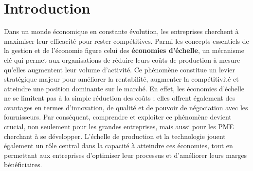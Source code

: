 
\begin{section}


 \chapter*{Introduction}

 \par
 Dans un monde économique en constante évolution, les entreprises cherchent à
 maximiser leur efficacité pour rester compétitives. Parmi les concepts
 essentiels de la gestion et de l’économie figure celui des \textbf{économies
   d’échelle}, un mécanisme clé qui permet aux organisations de réduire leurs
 coûts de production à mesure qu’elles augmentent leur volume d’activité. Ce
 phénomène constitue un levier stratégique majeur pour améliorer la rentabilité,
 augmenter la compétitivité et atteindre une position dominante sur le marché.
 En effet, les économies d’échelle ne se limitent pas à la simple réduction des
 coûts ; elles offrent également des avantages en termes d'innovation, de
 qualité et de pouvoir de négociation avec les fournisseurs. Par conséquent,
 comprendre et exploiter ce phénomène devient crucial, non seulement pour les
 grandes entreprises, mais aussi pour les PME cherchant à se développer.
 L’échelle de production et la technologie jouent également un rôle central dans
 la capacité à atteindre ces économies, tout en permettant aux entreprises
 d’optimiser leur processus et d'améliorer leurs marges bénéficiaires.

 \par

\end{section}
